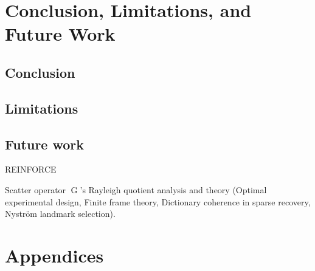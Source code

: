 \documentclass[titlepage,a4paper,11pt]{report}
\begin{document}
    

\chapter{Conclusion, Limitations, and Future Work}

    \section{Conclusion}
    
    \section{Limitations} \label{sec:limitations}


    \section{Future work} \label{sec:future_work}
    REINFORCE

    Scatter operator $\operatorname{G}$'s Rayleigh quotient analysis and theory (Optimal experimental design, Finite frame theory, Dictionary coherence in sparse recovery, Nyström landmark selection).

\clearpage
\printbibliography[heading=bibintoc,title=Bibliography]

\chapter{Appendices}
\end{document}
